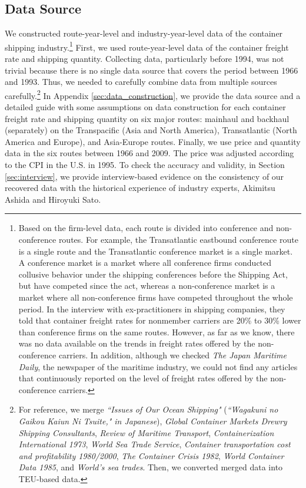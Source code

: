 \documentclass[11pt]{article}
\begin{document}
\subsection{Data Source}\label{subsec:data}
We constructed route-year-level and industry-year-level data of the container shipping industry.\footnote{Based on the firm-level data, each route is divided into conference and non-conference routes. For example, the Transatlantic eastbound conference route is a single route and the Transatlantic conference market is a single market. A conference market is a market where all conference firms conducted collusive behavior under the shipping conferences before the Shipping Act, but have competed since the act, whereas a non-conference market is a market where all non-conference firms have competed throughout the whole period. In the interview with ex-practitioners in shipping companies, they told that container freight rates for nonmember carriers are 20\% to 30\% lower than conference firms on the same routes. However, as far as we know, there was no data available on the trends in freight rates offered by the non-conference carriers. In addition, although we checked \textit{The Japan Maritime Daily}, the newspaper of the maritime industry, we could not find any articles that continuously reported on the level of freight rates offered by the non-conference carriers. } First, we used route-year-level data of the container freight rate and shipping quantity. Collecting data, particularly before 1994, was not trivial because there is no single data source that covers the period between 1966 and 1993. Thus, we needed to carefully combine data from multiple sources carefully.\footnote{For reference, we merge \textit{``Issues of Our Ocean Shipping"} (\textit{``Wagakuni no Gaikou Kaiun Ni Tsuite," in Japanese}), \textit{Global Container Markets Drewry Shipping Consultants}, \textit{Review of Maritime Transport}, \textit{Containerization International 1973}, \textit{World Sea Trade Service}, \textit{Container transportation cost and profitability 1980/2000}, \textit{The Container Crisis 1982}, \textit{World Container Data 1985}, and \textit{World's sea trades}. Then, we converted merged data into TEU-based data.} In Appendix \ref{sec:data_construction}, we provide the data source and a detailed guide with some assumptions on data construction for each container freight rate and shipping quantity on six major routes: mainhaul and backhaul (separately) on the Transpacific (Asia and North America), Transatlantic (North America and Europe), and Asia-Europe routes. Finally, we use price and quantity data in the six routes between 1966 and 2009. The price was adjusted according to the CPI in the U.S. in 1995. To check the accuracy and validity, in Section \ref{sec:interview}, we provide interview-based evidence on the consistency of our recovered data with the historical experience of industry experts, Akimitsu Ashida and Hiroyuki Sato.
\end{document}
